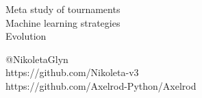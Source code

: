 \documentclass{beamer}
\begin{document}
\begin{frame}
\begin{center}
    \Large{Meta study of tournaments} \\
    \Large{Machine learning strategies} \\
    \Large{Evolution}
\end{center}
\end{frame}
\begin{frame}
	\begin{center}
		\small{@NikoletaGlyn}\\
		\small{https://github.com/Nikoleta-v3}\\
		\small{https://github.com/Axelrod-Python/Axelrod}
	\end{center}
\end{frame}
\end{document}
